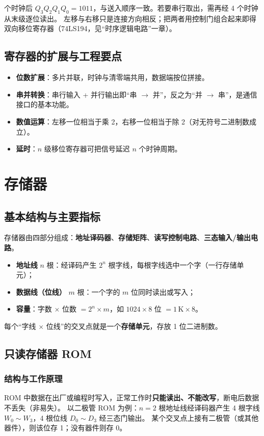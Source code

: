  个时钟后 $Q_3Q_2Q_1Q_0=1011$，与送入顺序一致。若要串行取出，需再经 4 个时钟从末级逐位读出。
左移与右移只是连接方向相反；把两者用控制门组合起来即得双向移位寄存器（74LS194，见“时序逻辑电路”一章）。

\subsection{寄存器的扩展与工程要点}
\begin{itemize}
    \item \textbf{位数扩展}：多片并联，时钟与清零端共用，数据端按位拼接。
    \item \textbf{串并转换}：串行输入 + 并行输出即“串 $\rightarrow$ 并”，反之为“并 $\rightarrow$ 串”，是通信接口的基本功能。
    \item \textbf{数值运算}：左移一位相当于乘 2，右移一位相当于除 2（对无符号二进制数成立）。
    \item \textbf{延时}：$n$ 级移位寄存器可把信号延迟 $n$ 个时钟周期。
\end{itemize}

\section{存储器}
\subsection{基本结构与主要指标}
存储器由四部分组成：\textbf{地址译码器}、\textbf{存储矩阵}、\textbf{读写控制电路}、\textbf{三态输入/输出电路}。
\begin{itemize}
    \item \textbf{地址线} $n$ 根：经译码产生 $2^n$ 根字线，每根字线选中一个字（一行存储单元）；
    \item \textbf{数据线（位线）} $m$ 根：一个字的 $m$ 位同时读出或写入；
    \item \textbf{容量}：字数 $\times$ 位数 $=2^n\times m$，如 $1024\times 8$ 位 $=1\,\mathrm{K}\times 8$。
\end{itemize}
每个“字线 $\times$ 位线”的交叉点就是一个\textbf{存储单元}，存放 1 位二进制数。

\subsection{只读存储器 ROM}
\subsubsection{结构与工作原理}
ROM 中数据在出厂或编程时写入，正常工作时\textbf{只能读出、不能改写}，断电后数据不丢失（非易失）。
以二极管 ROM 为例：$n=2$ 根地址线经译码器产生 4 根字线 $W_0\sim W_3$，4 根位线 $D_0\sim D_3$ 经三态门输出。
某个交叉点上接有二极管（或其他器件），则该位存 1；没有器件则存 0。

